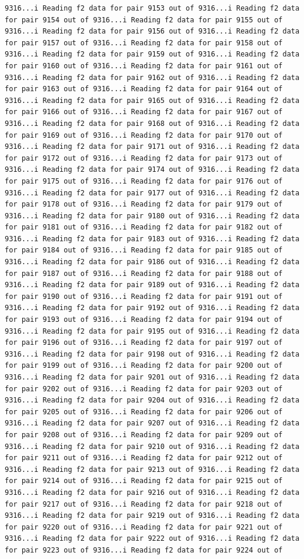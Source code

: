 \documentclass[
]{article}
\begin{document}
\begin{verbatim}
9316...i Reading f2 data for pair 9153 out of 9316...i Reading f2 data for pair 9154 out of 9316...i Reading f2 data for pair 9155 out of 9316...i Reading f2 data for pair 9156 out of 9316...i Reading f2 data for pair 9157 out of 9316...i Reading f2 data for pair 9158 out of 9316...i Reading f2 data for pair 9159 out of 9316...i Reading f2 data for pair 9160 out of 9316...i Reading f2 data for pair 9161 out of 9316...i Reading f2 data for pair 9162 out of 9316...i Reading f2 data for pair 9163 out of 9316...i Reading f2 data for pair 9164 out of 9316...i Reading f2 data for pair 9165 out of 9316...i Reading f2 data for pair 9166 out of 9316...i Reading f2 data for pair 9167 out of 9316...i Reading f2 data for pair 9168 out of 9316...i Reading f2 data for pair 9169 out of 9316...i Reading f2 data for pair 9170 out of 9316...i Reading f2 data for pair 9171 out of 9316...i Reading f2 data for pair 9172 out of 9316...i Reading f2 data for pair 9173 out of 9316...i Reading f2 data for pair 9174 out of 9316...i Reading f2 data for pair 9175 out of 9316...i Reading f2 data for pair 9176 out of 9316...i Reading f2 data for pair 9177 out of 9316...i Reading f2 data for pair 9178 out of 9316...i Reading f2 data for pair 9179 out of 9316...i Reading f2 data for pair 9180 out of 9316...i Reading f2 data for pair 9181 out of 9316...i Reading f2 data for pair 9182 out of 9316...i Reading f2 data for pair 9183 out of 9316...i Reading f2 data for pair 9184 out of 9316...i Reading f2 data for pair 9185 out of 9316...i Reading f2 data for pair 9186 out of 9316...i Reading f2 data for pair 9187 out of 9316...i Reading f2 data for pair 9188 out of 9316...i Reading f2 data for pair 9189 out of 9316...i Reading f2 data for pair 9190 out of 9316...i Reading f2 data for pair 9191 out of 9316...i Reading f2 data for pair 9192 out of 9316...i Reading f2 data for pair 9193 out of 9316...i Reading f2 data for pair 9194 out of 9316...i Reading f2 data for pair 9195 out of 9316...i Reading f2 data for pair 9196 out of 9316...i Reading f2 data for pair 9197 out of 9316...i Reading f2 data for pair 9198 out of 9316...i Reading f2 data for pair 9199 out of 9316...i Reading f2 data for pair 9200 out of 9316...i Reading f2 data for pair 9201 out of 9316...i Reading f2 data for pair 9202 out of 9316...i Reading f2 data for pair 9203 out of 9316...i Reading f2 data for pair 9204 out of 9316...i Reading f2 data for pair 9205 out of 9316...i Reading f2 data for pair 9206 out of 9316...i Reading f2 data for pair 9207 out of 9316...i Reading f2 data for pair 9208 out of 9316...i Reading f2 data for pair 9209 out of 9316...i Reading f2 data for pair 9210 out of 9316...i Reading f2 data for pair 9211 out of 9316...i Reading f2 data for pair 9212 out of 9316...i Reading f2 data for pair 9213 out of 9316...i Reading f2 data for pair 9214 out of 9316...i Reading f2 data for pair 9215 out of 9316...i Reading f2 data for pair 9216 out of 9316...i Reading f2 data for pair 9217 out of 9316...i Reading f2 data for pair 9218 out of 9316...i Reading f2 data for pair 9219 out of 9316...i Reading f2 data for pair 9220 out of 9316...i Reading f2 data for pair 9221 out of 9316...i Reading f2 data for pair 9222 out of 9316...i Reading f2 data for pair 9223 out of 9316...i Reading f2 data for pair 9224 out of 
\end{verbatim}
\end{document}
